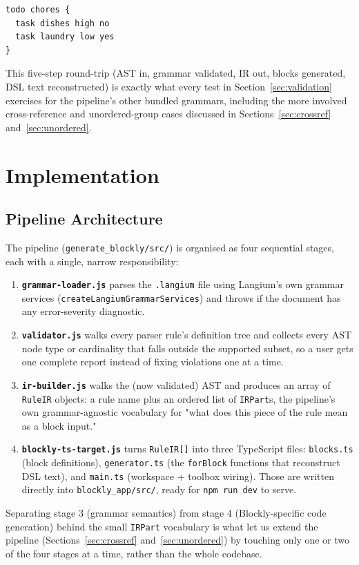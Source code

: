 \documentclass[runningheads]{llncs}
\begin{document}
\begin{lstlisting}[caption=Reconstructed DSL text for the workspace described above, label=lst:todo-output]
todo chores {
  task dishes high no
  task laundry low yes
}
\end{lstlisting}

This five-step round-trip (AST in, grammar validated, IR out, blocks generated, DSL text reconstructed) is exactly what every test in Section~\ref{sec:validation} exercises for the pipeline's other bundled grammars, including the more involved cross-reference and unordered-group cases discussed in Sections~\ref{sec:crossref} and~\ref{sec:unordered}.

\section{Implementation}

\subsection{Pipeline Architecture}
The pipeline (\texttt{generate\_blockly/src/}) is organised as four sequential stages, each with a single, narrow responsibility:
\begin{enumerate}
\item \textbf{\texttt{grammar-loader.js}} parses the \texttt{.langium} file using Langium's own grammar services (\texttt{createLangiumGrammarServices}) and throws if the document has any error-severity diagnostic.
\item \textbf{\texttt{validator.js}} walks every parser rule's definition tree and collects every AST node type or cardinality that falls outside the supported subset, so a user gets one complete report instead of fixing violations one at a time.
\item \textbf{\texttt{ir-builder.js}} walks the (now validated) AST and produces an array of \texttt{RuleIR} objects: a rule name plus an ordered list of \texttt{IRPart}s, the pipeline's own grammar-agnostic vocabulary for "what does this piece of the rule mean as a block input."
\item \textbf{\texttt{blockly-\allowbreak ts-\allowbreak target.js}} turns
\texttt{RuleIR[]} into three TypeScript files: 
\newline \texttt{blocks.ts} (block definitions), \texttt{generator.ts} (the \texttt{forBlock} functions that reconstruct DSL text), and \texttt{main.ts} (workspace + toolbox wiring). Those are written directly into \texttt{blockly\_app\slash src\slash}, ready for \texttt{npm run dev} to serve.
\end{enumerate}
Separating stage 3 (grammar semantics) from stage 4 (Blockly-specific code generation) behind the small \texttt{IRPart} vocabulary is what let us extend the pipeline (Sections~\ref{sec:crossref} and~\ref{sec:unordered}) by touching only one or two of the four stages at a time, rather than the whole codebase.
\end{document}
